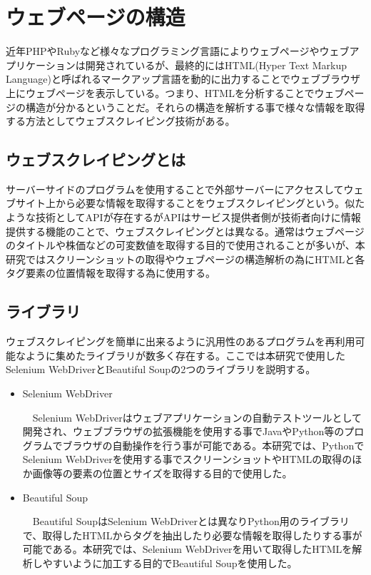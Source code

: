 \newpage
\renewcommand{\baselinestretch}{1.5} %
\section{ウェブページの構造}\label{sec:scraping}
\renewcommand{\baselinestretch}{1} %
\par 近年PHPやRubyなど様々なプログラミング言語によりウェブページやウェブアプリケーションは開発されているが、最終的にはHTML(Hyper Text Markup Language)と呼ばれるマークアップ言語\cite{mozilla_html}を動的に出力することでウェブブラウザ上にウェブページを表示している。つまり、HTMLを分析することでウェブページの構造が分かるということだ。それらの構造を解析する事で様々な情報を取得する方法としてウェブスクレイピング技術がある。
\subsection{ウェブスクレイピングとは}
\par サーバーサイドのプログラムを使用することで外部サーバーにアクセスしてウェブサイト上から必要な情報を取得することをウェブスクレイピングという\cite{ntt_scraping}。似たような技術としてAPIが存在するがAPIはサービス提供者側が技術者向けに情報提供する機能のことで、ウェブスクレイピングとは異なる。通常はウェブページのタイトルや株価などの可変数値を取得する目的で使用されることが多いが、本研究ではスクリーンショットの取得やウェブページの構造解析の為にHTMLと各タグ要素の位置情報を取得する為に使用する。

\subsection{ライブラリ}
\par ウェブスクレイピングを簡単に出来るように汎用性のあるプログラムを再利用可能なように集めたライブラリが数多く存在する。ここでは本研究で使用したSelenium WebDriver\cite{selenium}とBeautiful Soup\cite{beautifulsoup}の2つのライブラリを説明する。

\begin{itemize}
    \item Selenium WebDriver
    \par ~~Selenium WebDriverはウェブアプリケーションの自動テストツールとして開発され、ウェブブラウザの拡張機能を使用する事でJavaやPython等のプログラムでブラウザの自動操作を行う事が可能である。本研究では、PythonでSelenium WebDriverを使用する事でスクリーンショットやHTMLの取得のほか画像等の要素の位置とサイズを取得する目的で使用した。 \\

    \item Beautiful Soup
    \par ~~Beautiful SoupはSelenium WebDriverとは異なりPython用のライブラリで、取得したHTMLからタグを抽出したり必要な情報を取得したりする事が可能である。本研究では、Selenium WebDriverを用いて取得したHTMLを解析しやすいように加工する目的でBeautiful Soupを使用した。 \\
\end{itemize}
